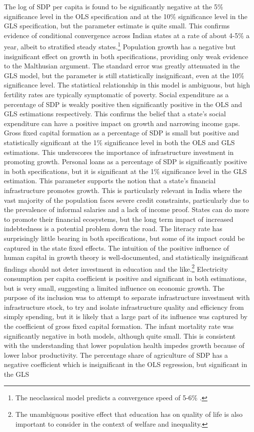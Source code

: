 \documentclass[a4paper, 11pt]{article}
\begin{document}
The log of SDP per capita is found to be significantly negative at the 5\% significance level in the OLS specification and at the 10\% significance level in the GLS specification, but the parameter estimate is quite small.  This confirms evidence of conditional convergence across Indian states at a rate of about 4-5\% a year, albeit to stratified steady states.\footnote{The neoclassical model predicts a convergence speed of 5-6\% \citep{barro_convergence_1992}.}  Population growth has a negative but insignificant effect on growth in both specifications, providing only weak evidence to the Malthusian argument.  The standard error was greatly attenuated in the GLS model, but the parameter is still statistically insignificant, even at the 10\% significance level.  The statistical relationship in this model is ambiguous, but high fertility rates are typically symptomatic of poverty.  Social expenditure as a percentage of SDP is weakly positive then significantly positive in the OLS and GLS estimations respectively.  This confirms the belief that a state’s social expenditure can have a positive impact on growth and narrowing income gaps.  Gross fixed capital formation as a percentage of SDP is small but positive and statistically significant at the 1\% significance level in both the OLS and GLS estimations.  This underscores the importance of infrastructure investment in promoting growth.  Personal loans as a percentage of SDP is significantly positive in both specifications, but it is significant at the 1\% significance level in the GLS estimation.  This parameter supports the notion that a state’s financial infrastructure promotes growth.  This is particularly relevant in India where the vast majority of the population faces severe credit constraints, particularly due to the prevalence of informal salaries and a lack of income proof.  States can do more to promote their financial ecosystems, but the long term impact of increased indebtedness is a potential problem down the road.  The literacy rate has surprisingly little bearing in both specifications, but some of its impact could be captured in the state fixed effects.  The intuition of the positive influence of human capital in growth theory is well-documented, and statistically insignificant findings should not deter investment in education and the like.\footnote{The unambiguous positive effect that education has on quality of life is also important to consider in the context of welfare and inequality.}  Electricity consumption per capita coefficient is positive and significant in both estimations, but is very small, suggesting a limited influence on economic growth.  The purpose of its inclusion was to attempt to separate infrastructure investment with infrastructure stock, to try and isolate infrastructure quality and efficiency from simply spending, but it is likely that a large part of its influence was captured by the coefficient of gross fixed capital formation.  The infant mortality rate was significantly negative in both models, although quite small.  This is consistent with the understanding that lower population health impedes growth because of lower labor productivity.  The percentage share of agriculture of SDP has a negative coefficient which is insignificant in the OLS regression, but significant in the GLS 
\end{document}
